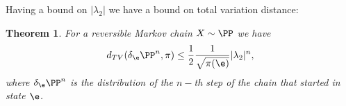 \documentclass[a4paper,12pt]{article}
\newtheorem{theorem}{Theorem}
\begin{document}
 Having a bound on $|\lambda_2|$ we have a bound on total variation distance:
\begin{theorem} For a reversible Markov chain $X\sim\PP$ we have
$$d_{TV}(\delta_\e\PP^n,\pi)\leq {1\over 2} {1\over \sqrt{\pi(\e)}} |\lambda_2|^n,$$
where $\delta_\e\PP^n$ is the distribution of the $n-$th step of the chain that started in state $\e$.
\end{theorem}

\newpage 
\end{document}
